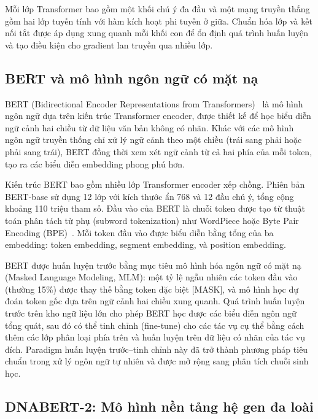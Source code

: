 Mỗi lớp Transformer bao gồm một khối chú ý đa đầu và một mạng truyền thẳng gồm hai lớp tuyến tính với hàm kích hoạt phi tuyến ở giữa. Chuẩn hóa lớp và kết nối tắt được áp dụng xung quanh mỗi khối con để ổn định quá trình huấn luyện và tạo điều kiện cho gradient lan truyền qua nhiều lớp.

\subsection{BERT và mô hình ngôn ngữ có mặt nạ}
\label{subsec:bert}

BERT (Bidirectional Encoder Representations from Transformers)~\cite{devlin2019bert} là mô hình ngôn ngữ dựa trên kiến trúc Transformer encoder, được thiết kế để học biểu diễn ngữ cảnh hai chiều từ dữ liệu văn bản không có nhãn. Khác với các mô hình ngôn ngữ truyền thống chỉ xử lý ngữ cảnh theo một chiều (trái sang phải hoặc phải sang trái), BERT đồng thời xem xét ngữ cảnh từ cả hai phía của mỗi token, tạo ra các biểu diễn embedding phong phú hơn.

Kiến trúc BERT bao gồm nhiều lớp Transformer encoder xếp chồng. Phiên bản BERT-base sử dụng 12 lớp với kích thước ẩn 768 và 12 đầu chú ý, tổng cộng khoảng 110 triệu tham số. Đầu vào của BERT là chuỗi token được tạo từ thuật toán phân tách từ phụ (subword tokenization) như WordPiece hoặc Byte Pair Encoding (BPE)~\cite{sennrich2015neural}. Mỗi token đầu vào được biểu diễn bằng tổng của ba embedding: token embedding, segment embedding, và position embedding.

BERT được huấn luyện trước bằng mục tiêu mô hình hóa ngôn ngữ có mặt nạ (Masked Language Modeling, MLM): một tỷ lệ ngẫu nhiên các token đầu vào (thường 15\%) được thay thế bằng token đặc biệt [MASK], và mô hình học dự đoán token gốc dựa trên ngữ cảnh hai chiều xung quanh. Quá trình huấn luyện trước trên kho ngữ liệu lớn cho phép BERT học được các biểu diễn ngôn ngữ tổng quát, sau đó có thể tinh chỉnh (fine-tune) cho các tác vụ cụ thể bằng cách thêm các lớp phân loại phía trên và huấn luyện trên dữ liệu có nhãn của tác vụ đích. Paradigm huấn luyện trước--tinh chỉnh này đã trở thành phương pháp tiêu chuẩn trong xử lý ngôn ngữ tự nhiên và được mở rộng sang phân tích chuỗi sinh học.

\subsection{DNABERT-2: Mô hình nền tảng hệ gen đa loài}
\label{subsec:dnabert2}


